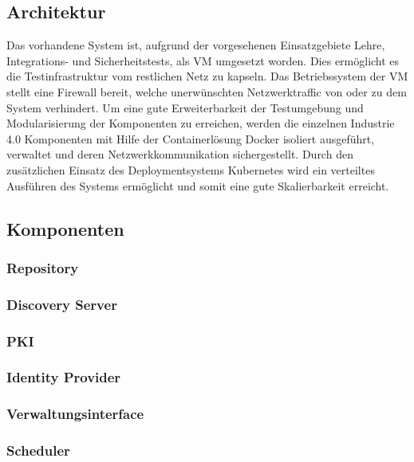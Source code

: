 \subsection{Architektur}
Das vorhandene System ist, aufgrund der vorgesehenen Einsatzgebiete Lehre, Integrations- und Sicherheitstests, als \ac{VM} umgesetzt worden. Dies ermöglicht es die Testinfrastruktur vom restlichen Netz zu kapseln. Das Betriebssystem der \ac{VM} stellt eine Firewall bereit, welche unerwünschten Netzwerktraffic von oder zu dem System verhindert. Um eine gute Erweiterbarkeit der Testumgebung und Modularisierung der Komponenten zu erreichen, werden die einzelnen Industrie 4.0 Komponenten mit Hilfe der Containerlösung Docker isoliert ausgeführt, verwaltet und deren Netzwerkkommunikation sichergestellt. Durch den zusätzlichen Einsatz des Deploymentsystems Kubernetes wird ein verteiltes Ausführen des Systems ermöglicht und somit eine gute Skalierbarkeit erreicht. 

\subsection{Komponenten}
\subsubsection{Repository}
\subsubsection{Discovery Server}
\subsubsection{\ac{PKI}}
\subsubsection{Identity Provider}
\subsubsection{Verwaltungsinterface}
\subsubsection{Scheduler}